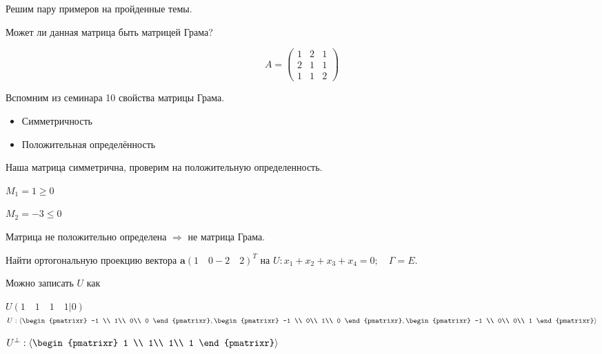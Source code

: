 Решим пару примеров на пройденные темы.
\begin{prim}
Может ли данная матрица быть матрицей Грама?

$$A=\left(\begin{array}{rrr}
    1 & 2&1 \\
     2&1&1\\
     1&1&2
\end{array}\right)$$
\end{prim}
Вспомним из семинара 10 свойства матрицы Грама.
\begin{itemize}
    \item Симметричность 
    \item Положительная определённость
\end{itemize}

Наша матрица симметрична, проверим на положительную определенность.

$M_1=1\geq0 $

$M_2=-3\leq0$

Матрица не положительно определена $\Rightarrow$ не матрица Грама.

\begin{prim}
Найти ортогональную проекцию вектора $\textbf{a} (1\quad 0 -2 \quad2)^T$ на $U: x_1+x_2+x_3+x_4=0;\quad \Gamma =E$.
\end{prim}
Можно записать $U$ как

$U(1\quad1\quad1\quad1|0)$\qquad $U:\langle \begin{pmatrixr}
     -1 \\
      1\\
      0\\
      0
\end{pmatrixr},\begin{pmatrixr}
     -1 \\
      0\\
      1\\
      0
\end{pmatrixr},\begin{pmatrixr}
     -1 \\
      0\\
      0\\
      1
\end{pmatrixr}\rangle$

$U^{\perp}:\langle\begin{pmatrixr}
     1 \\
     1\\
     1\\
      1
\end{pmatrixr}\rangle$
\vspace{2mm}

